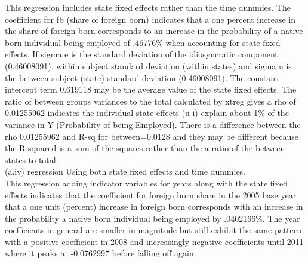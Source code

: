 \documentclass{article}
\begin{document}
\begin{enumerate}[label=\alph*]
This regression includes state fixed effects rather than the time dummies. The coefficient for fb (share of foreign born) indicates that a one percent increase in the share of foreign born corresponds to an increase in the probability of a native born individual being employed of .46776\% when accounting for state fixed effects. 
If sigma e is the standard deviation of the idiosyncratic component (0.46008091), within subject standard deviation (within states) and sigma u is the between subject (state) standard deviation (0.46008091). 
The constant intercept term 0.619118 may be the average value of the state fixed effects. The ratio of between groups variances to the total calculated by xtreg gives a rho of 0.01255962 indicates the individual state effects (u i) explain about 1\% of the variance in Y (Probability of being Employed).
There is a difference between the rho 0.01255962 and R-sq for between=0.0128 and they may be different because the R squared is a sum of the squares rather than the a ratio of the between states to total. \\

(a.iv) regression Using both state fixed effects and time dummies.\\

This regression adding indicator variables for years along with the state fixed effects indicates that the coefficient for foreign born share in the 2005 base year that a one unit (percent) increase in foreign born corresponds with an increase in the probability a native born individual being employed by .0402166\%. The year coefficients in general are smaller in magnitude but still exhibit the same pattern with a positive coefficient in 2008 and increasingly negative coefficients until 2011 where it peaks at -0.0762997 before falling off again.\\


\end{enumerate}
\end{document}
